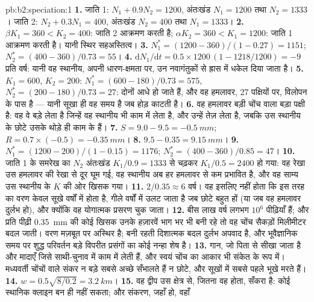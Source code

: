 \begin{solution}{pb:b2:speciation:1}
\textbf{1.} जाति 1: $N_1 + 0.9N_2 = 1200$, अंतःखंड $N_1 = 1200$
तथा $N_2 = 1333$। जाति 2: $N_2 + 0.3N_1 = 400$, अंतःखंड $N_2 =
400$ तथा $N_1 = 1333$।
\textbf{2.} $\beta K_1 = 360 < K_2 = 400$: जाति 2 आक्रमण करती है;
$\alpha K_2 = 360 < K_1 = 1200$: जाति 1 आक्रमण करती है। यानी स्थिर
सहअस्तित्व।
\textbf{3.} $N_1^{*} = (1200 - 360)/(1 - 0.27) = 1151$; $N_2^{*} =
(400 - 360)/0.73 = 55$।
\textbf{4.} $\mathrm{d}N_1/\mathrm{d}t = 0.5\times 1200\,(1 - 1218/1200)
= -9$ प्रति वर्ष: यानी वह स्थानीय, अपनी धारण-क्षमता पर, उन नवागंतुकों से
ह्रास में धकेल दिया जाता है।
\textbf{5.} $K_1 = 600$, $K_2 = 200$: $N_1^{*} = (600 - 180)/0.73 =
575$, $N_2^{*} = (200 - 180)/0.73 = 27$: दोनों आधे हो जाते हैं, और वह हमलावर,
27 पक्षियों पर, विलोपन के पास है --- यानी सूखा ही वह समय है जब
होड़ काटती है।
\textbf{6.} वह हमलावर बड़ी चोंच वाला बड़ा पक्षी है: वह
वे बड़े  लेता है जिन्हें वह स्थानीय भी काम में लेता है, और उन्हें तेज़ लेता है,
जबकि उस स्थानीय के छोटे  उसके थोड़े ही काम के हैं।
\textbf{7.} $S = 9.0 - 9.5 = \qty{-0.5}{mm}$; $R = 0.7\times(-0.5) =
\qty{-0.35}{mm}$।
\textbf{8.} $9.5 - 0.35 = \qty{9.15}{mm}$।
\textbf{9.} $N_1^{*} = (1200 - 200)/(1 - 0.15) = 1176$; $N_2^{*} =
(400 - 360)/0.85 = 47$।
\textbf{10.} जाति 1 के समरेख का $N_2$ अंतःखंड
$K_1/0.9 = 1333$ से चढ़कर $K_1/0.5 = 2400$ हो गया: वह रेखा उस
हमलावर की रेखा से दूर घूम गई, वह स्थानीय अब हर हमलावर से कम प्रभावित है,
और वह साम्य उस स्थानीय के $K$ की ओर खिसक गया।
\textbf{11.} $2/0.35 \approx 6$ वर्ष। वह इसलिए नहीं होता कि इस तरह का वरण
केवल सूखे वर्षों में होता है, गीले वर्षों में उलट जाता है
जब छोटे  बहुत हों (या जब वह हमलावर दुर्लभ हो), और
क्योंकि वह योगात्मक प्रसरण चुक जाता।
\textbf{12.} बीस लाख वर्ष लगभग $10^{6}$ पीढ़ियाँ हैं; और प्रति पीढ़ी
\qty{0.35}{mm} की कोई खिसक उनके हज़ारवें भाग भर भी बनी रहे तो
वह चोंच सैकड़ों मिलीमीटर बदल जाती। वरण
मज़बूत पर अस्थिर है; बनी रहती दिशात्मक बदल दुर्लभ
अपवाद है, और भूवैज्ञानिक समय पर शुद्ध परिवर्तन बड़े विपरीत प्रसंगों का
कोई नन्हा शेष है।
\textbf{13.} गान, जो पिता से सीखा जाता है और मादाएँ जिसे
साथी-चुनाव में काम में लेती हैं, और स्वयं चोंच का आकार भी संकेत के रूप में। मध्यवर्ती चोंचों वाले
संकर न बड़े  सबसे अच्छे सँभालते हैं न छोटे,
और सूखों में सबसे पहले भूखे मरते हैं।
\textbf{14.} $w = 0.5\sqrt{8/0.2} = \qty{3.2}{km}$।
\textbf{15.} वह द्वीप उस क्षेत्र से, जितना वह होता, सँकरा है: कोई
स्थानिक क्लाइन बन ही नहीं सकता; और संकरण, जहाँ हो, वहाँ

\end{solution}
